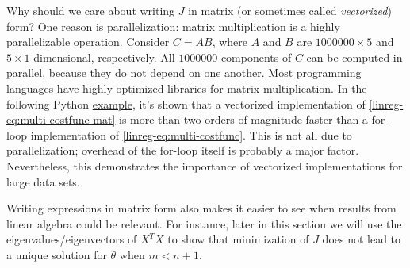\documentclass{article}
\theoremstyle{definition}
\begin{document}
Why should we care about writing $J$ in matrix (or sometimes called \textit{vectorized}) form? One reason is parallelization: matrix multiplication is a highly parallelizable operation. Consider $C=AB$, where $A$ and $B$ are $1000000 \times 5$ and $5 \times 1$ dimensional, respectively. All $1000000$ components of $C$ can be computed in parallel, because they do not depend on one another. Most programming languages have highly optimized libraries for matrix multiplication. In the following Python \href{https://github.com/siavashaslanbeigi/machine_learning/blob/master/lin_reg/matrix.ipynb}{\color{blue} example}, it's shown that a vectorized implementation of \eqref{linreg-eq:multi-costfunc-mat} is more than two orders of magnitude faster than a for-loop implementation of \eqref{linreg-eq:multi-costfunc}. This is not all due to parallelization; overhead of the for-loop itself is probably a major factor. Nevertheless, this demonstrates the importance of vectorized implementations for large data sets.

Writing expressions in matrix form also makes it easier to see when results from linear algebra could be relevant. For instance, later in this section we will use the eigenvalues/eigenvectors of $X^TX$ to show that minimization of $J$ does not lead to a unique solution for $\theta$ when $m<n+1$.


\end{document}
